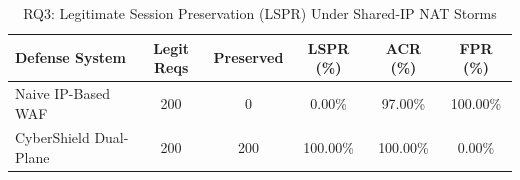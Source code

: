 \begin{table}[htbp]
\centering
\caption{RQ3: Legitimate Session Preservation (LSPR) Under Shared-IP NAT Storms}
\label{tab:rq3_nat}
\begin{tabular}{lccccc}
\toprule
\textbf{Defense System} & \textbf{Legit Reqs} & \textbf{Preserved} & \textbf{LSPR (\%)} & \textbf{ACR (\%)} & \textbf{FPR (\%)} \\
\midrule
    Naive IP-Based WAF & 200 & 0 & 0.00\% & 97.00\% & 100.00\% \\
    CyberShield Dual-Plane & 200 & 200 & 100.00\% & 100.00\% & 0.00\% \\
\bottomrule
\end{tabular}
\end{table}
